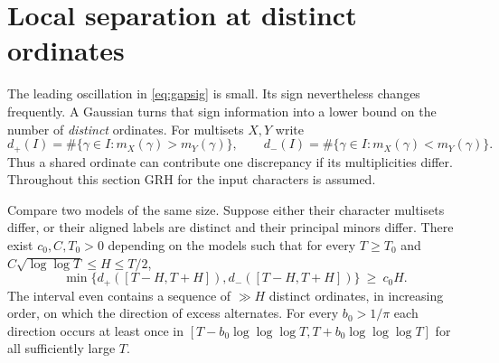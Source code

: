 \section{Local separation at distinct ordinates}\label{sec:localwindows}

The leading oscillation in \eqref{eq:gapsig} is small. Its sign nevertheless
changes frequently. A Gaussian turns that sign information into a lower bound
on the number of \emph{distinct} ordinates. For multisets $X,Y$ write
\[
 d_+(I)=\#\{\gamma\in I:m_X(\gamma)>m_Y(\gamma)\},\qquad
 d_-(I)=\#\{\gamma\in I:m_X(\gamma)<m_Y(\gamma)\}.
\]
Thus a shared ordinate can contribute one discrepancy if its multiplicities
differ. Throughout this section GRH for the input characters is assumed.

\begin{theorem}\label{thm:localcoupled}
Compare two models of the same size. Suppose either their character multisets
differ, or their aligned labels are distinct and their principal minors differ.
There exist $c_0,C,T_0>0$ depending on the models such that for every
$T\ge T_0$ and $C\sqrt{\log\log T}\le H\le T/2$,
\[
 \min\{d_+([T-H,T+H]),d_-([T-H,T+H])\}\ \ge\ c_0 H .
\]
The interval even contains a sequence of $\gg H$ distinct ordinates, in increasing order, on which the direction of excess alternates.
For every $b_0>1/\pi$ each direction occurs at least once in
$[T-b_0\log\log\log T,T+b_0\log\log\log T]$ for all sufficiently large $T$.
\end{theorem}

